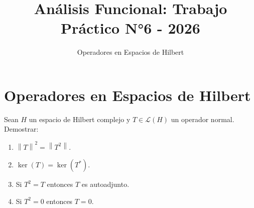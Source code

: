 \documentclass{article}
\theoremstyle{definition}
\newcommand{\norm}[1]{\left\lVert #1 \right\rVert}       %
\newcommand{\LH}{\mathcal{L}(H)}                         %
\newcommand{\Ker}{\operatorname{ker}}                    %
\newenvironment{ejercicio}[1]{\begin{trivlist}
\item[\hskip \labelsep {\bfseries Ejercicio}\hskip \labelsep {\bfseries #1.}]}{\end{trivlist}}
\begin{document}
\title{Análisis Funcional: Trabajo Práctico N°6 - 2026}
\author{Operadores en Espacios de Hilbert}
\date{}

\maketitle

\vspace{0.8cm}

\section{Operadores en Espacios de Hilbert}

\begin{ejercicio}{1}
	Sean \( H \) un espacio de Hilbert complejo y \( T \in \LH \) un operador normal. Demostrar:
	\begin{enumerate}
		\item \( \norm{T}^2 = \norm{T^2} \).
		\item \( \Ker(T) = \Ker(T^*) \).
		\item Si \( T^2 = T \) entonces \( T \) es autoadjunto.
		\item Si \( T^2 = 0 \) entonces \( T = 0 \).
	\end{enumerate}
\end{ejercicio}
\end{document}
